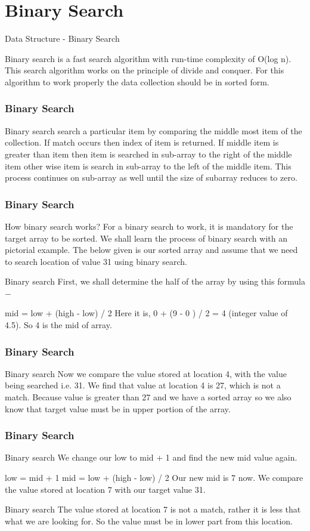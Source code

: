 \documentclass[algocomplexity.tex]{subfiles}
\begin{document}
\section{Binary Search}
\begin{frame}
	Data Structure - Binary Search
	
	Binary search is a fast search algorithm with run-time complexity of O(log n). This search algorithm works on the principle of divide and conquer. For this algorithm to work properly the data collection should be in sorted form.
\end{frame}

\begin{frame}
	\frametitle{Binary Search}
	\large
	Binary search search a particular item by comparing the middle most item of the collection. If match occurs then index of item is returned. If middle item is greater than item then item is searched in sub-array to the right of the middle item other wise item is search in sub-array to the left of the middle item. This process continues on sub-array as well until the size of subarray reduces to zero.
\end{frame}

\begin{frame}
	\frametitle{Binary Search}
	\large
	How binary search works?
	For a binary search to work, it is mandatory for the target array to be sorted. We shall learn the process of binary search with an pictorial example. The below given is our sorted array and assume that we need to search location of value 31 using binary search.
	
	Binary search
	First, we shall determine the half of the array by using this formula −
	
	mid = low + (high - low) / 2
	Here it is, 0 + (9 - 0 ) / 2 = 4 (integer value of 4.5). So 4 is the mid of array.
\end{frame}
\begin{frame}
	\frametitle{Binary Search}
	\large
	Binary search
	Now we compare the value stored at location 4, with the value being searched i.e. 31. We find that value at location 4 is 27, which is not a match. Because value is greater than 27 and we have a sorted array so we also know that target value must be in upper portion of the array.
\end{frame}
\begin{frame}
	\frametitle{Binary Search}
	\large
	Binary search
	We change our low to mid + 1 and find the new mid value again.
	
	low = mid + 1
	mid = low + (high - low) / 2
	Our new mid is 7 now. We compare the value stored at location 7 with our target value 31.
	
	Binary search
	The value stored at location 7 is not a match, rather it is less that what we are looking for. So the value must be in lower part from this location.
\end{frame}
\end{document}
